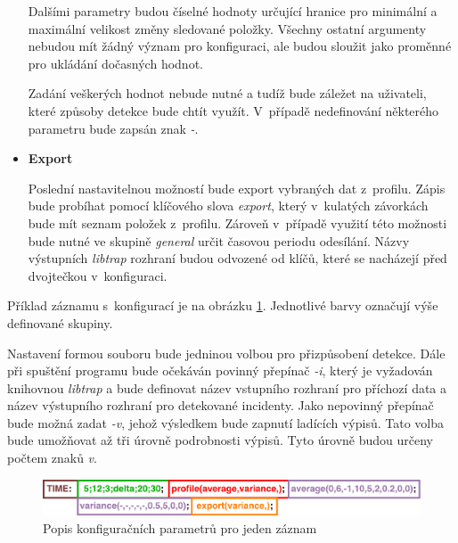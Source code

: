 \begin{itemize}
  Dalšími parametry budou číselné hodnoty určující hranice pro minimální a maximální velikost 
  změny sledované položky. Všechny ostatní argumenty nebudou mít žádný význam pro konfiguraci, ale 
  budou sloužit jako proměnné pro ukládání dočasných hodnot.
  
  Zadání veškerých hodnot nebude nutné a tudíž bude záležet na uživateli, které způsoby detekce 
  bude chtít využít. V~případě nedefinování některého parametru bude zapsán znak \textit{-}.
  
  \item \textbf{Export}
  
  Poslední nastavitelnou možností bude export vybraných dat z~profilu. Zápis bude probíhat pomocí 
  klíčového slova \textit{export}, který v~kulatých závorkách bude mít seznam položek z~profilu. Zároveň 
  v~případě využití této možnosti bude nutné ve skupině \textit{general} určit časovou periodu
  odesílání.
  Názvy výstupních \textit{libtrap} rozhraní
  budou odvozené od klíčů, které se nacházejí před dvojtečkou v~konfiguraci.
  
 \end{itemize}

 Příklad záznamu s~konfigurací je na obrázku \ref{obr.config}. Jednotlivé barvy označují 
 výše definované skupiny. 
 
 Nastavení formou
 souboru bude jedninou volbou pro přizpůsobení detekce. Dále při 
 spuštění programu bude očekáván povinný přepínač \textit{-i}, který je vyžadován knihovnou 
 \textit{libtrap} a bude definovat název vstupního
 rozhraní pro příchozí data a název výstupního rozhraní pro detekované incidenty. Jako nepovinný přepínač
 bude možná zadat \textit{-v}, jehož výsledkem bude zapnutí ladících výpisů. Tato volba bude umožňovat 
 až tři úrovně podrobnosti výpisů. Tyto úrovně budou určeny počtem znaků \textit{v}.
 
   \begin{figure}[ht]
   \begin{center}
   \includegraphics[scale=0.5]{pictures/config-file-frame}
   \caption{Popis konfiguračních parametrů pro jeden záznam}
   \label{obr.config}
   \end{center}
   \end{figure}
 
